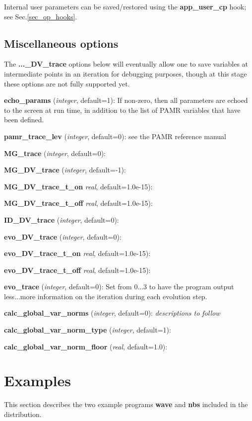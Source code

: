 \documentclass[aps,amssymb,unsortedaddress,nofootinbib]{revtex4}
\def\lsep{\itemsep 0.05in}
\begin{document}
Internal user parameters can be saved/restored using the {\bf app\_user\_cp} hook;
see Sec.\ref{sec_op_hooks}.

\subsection{Miscellaneous options}

The {\bf ...\_DV\_trace} options below will eventually allow one to 
save variables at intermediate points in an iteration for debugging purposes,
though at this stage these options are not fully supported yet.

\begin{list}{}{\lsep}
\item {\bf echo\_params} ({\em integer}, default=1): If non-zero, then all
      parameters are echoed to the screen at run time, in addition to the
      list of PAMR variables that have been defined.
\item {\bf pamr\_trace\_lev} ({\em integer}, default=0): see the PAMR reference
      manual \cite{pamr}
\item {\bf MG\_trace} ({\em integer}, default=0): 
\item {\bf MG\_DV\_trace} ({\em integer}, default=-1):
\item {\bf MG\_DV\_trace\_t\_on} {\em real}, default=1.0e-15):
\item {\bf MG\_DV\_trace\_t\_off} {\em real}, default=1.0e-15):
\item {\bf ID\_DV\_trace} ({\em integer}, default=0):
\item {\bf evo\_DV\_trace} ({\em integer}, default=0):
\item {\bf evo\_DV\_trace\_t\_on} {\em real}, default=1.0e-15):
\item {\bf evo\_DV\_trace\_t\_off} {\em real}, default=1.0e-15):
\item {\bf evo\_trace} ({\em integer}, default=0): Set from 0...3 
      to have the program output less...more information on the
      iteration during each evolution step.
\item {\bf calc\_global\_var\_norms} ({\em integer}, default=0): {\em descriptions to follow}
\item {\bf calc\_global\_var\_norm\_type} ({\em integer}, default=1):
\item {\bf calc\_global\_var\_norm\_floor} ({\em real}, default=1.0):
\end{list}

\section{Examples}\label{sec_example}
This section describes the two example programs {\bf wave} and {\bf nbs} included in the distribution.
\end{document}
